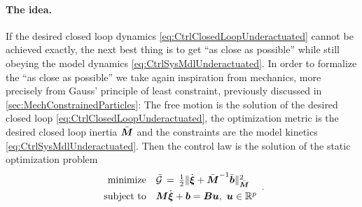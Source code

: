 \paragraph{The idea.}
If the desired closed loop dynamics \eqref{eq:CtrlClosedLoopUnderactuated} cannot be achieved exactly, the next best thing is to get ``as close as possible'' while still obeying the model dynamics \eqref{eq:CtrlSysMdlUnderactuated}.
In order to formalize the ``as close as possible'' we take again inspiration from mechanics, more precisely from Gauss' principle of least constraint, previously discussed in \autoref{sec:MechConstrainedParticles}:
The free motion is the solution of the desired closed loop \eqref{eq:CtrlClosedLoopUnderactuated}, the optimization metric is the desired closed loop inertia $\sysInertiaMatC$ and the constraints are the model kinetics \eqref{eq:CtrlSysMdlUnderactuated}.
Then the control law is the solution of the static optimization problem
\begin{align}\label{eq:MinProbUnderactuated}
 \begin{array}{rl}
  \text{minimize} & \GaussianConstraintC \, = \, \tfrac{1}{2} \norm[\sysInertiaMatC]{\sysVeld + \sysInertiaMatC^{-1} \sysForceC}^2
  \\[1ex]
  \text{subject to} & \sysInertiaMat \sysVeld + \sysForce = \sysInputMat \sysInput, \ \sysInput \in \RealNum^\numInputs 
 \end{array}
 .
\end{align}

